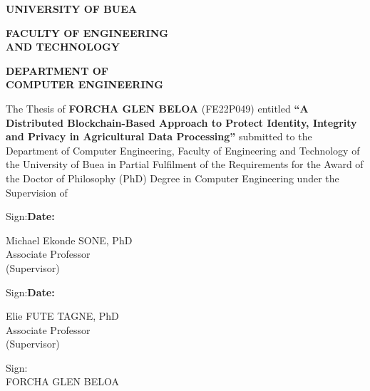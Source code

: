 %
\begin{singlespace}

\begin{center}
  \textbf{UNIVERSITY OF BUEA}
\end{center}

\vspace{\baselineskip}

\noindent
\begin{minipage}[t]{0.56\textwidth}
  \raggedright
  \textbf{FACULTY OF ENGINEERING\\AND TECHNOLOGY}
\end{minipage}%
\begin{minipage}[t]{0.44\textwidth}
  \raggedright
  \textbf{DEPARTMENT OF\\COMPUTER ENGINEERING}
\end{minipage}

\vspace{2\baselineskip}

The Thesis of \textbf{FORCHA GLEN BELOA} (FE22P049) entitled
\textbf{``A Distributed Blockchain-Based Approach to Protect Identity,
Integrity and Privacy in Agricultural Data Processing''} submitted to the
Department of Computer Engineering, Faculty of Engineering and Technology
of the University of Buea in Partial Fulfilment of the Requirements for
the Award of the Doctor of Philosophy (PhD) Degree in Computer Engineering
under the Supervision of

\vspace{2\baselineskip}

Sign:\hrulefill \hfill \textbf{Date:}\hrulefill

\vspace{\baselineskip}
\noindent Michael Ekonde SONE, PhD\\
Associate Professor\\
(Supervisor)

\vspace{2\baselineskip}

Sign:\hrulefill \hfill \textbf{Date:}\hrulefill

\vspace{\baselineskip}
\noindent Elie FUTE TAGNE, PhD\\
Associate Professor\\
(Supervisor)

\vspace{2\baselineskip}

\begin{center}
Sign:\hrulefill\\
FORCHA GLEN BELOA
\end{center}

\end{singlespace}
\clearpage
